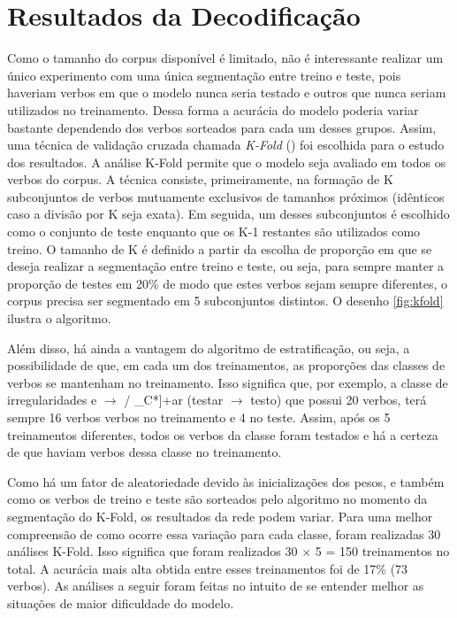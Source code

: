 \section{Resultados da Decodificação}
\label{sec:results}
Como o tamanho do corpus disponível é limitado, não é interessante realizar um único experimento com uma única segmentação entre treino e teste, pois haveriam verbos em que o modelo nunca seria testado e outros que nunca seriam utilizados no treinamento. Dessa forma a acurácia do modelo poderia variar bastante dependendo dos verbos sorteados para cada um desses grupos. Assim, uma técnica de validação cruzada chamada \textit{K-Fold} (\cite{kfold:2018}) foi escolhida para o estudo dos resultados. A análise K-Fold permite que o modelo seja avaliado em todos os verbos do corpus. A técnica consiste, primeiramente, na formação de K subconjuntos de verbos mutuamente exclusivos de tamanhos próximos (idênticos caso a divisão por K seja exata). Em seguida, um desses subconjuntos é escolhido como o conjunto de teste enquanto que os K-1 restantes são utilizados como treino. O tamanho de K é definido a partir da escolha de proporção em que se deseja realizar a segmentação entre treino e teste, ou seja, para sempre manter a proporção de testes em 20\% de modo que estes verbos sejam sempre diferentes, o corpus precisa ser segmentado em 5 subconjuntos distintos. O desenho \ref{fig:kfold} ilustra o algoritmo. 



Além disso, há ainda a vantagem do algoritmo de estratificação, ou seja, a possibilidade de que, em cada um dos treinamentos, as proporções das classes de verbos se mantenham no treinamento. Isso significa que, por exemplo, a classe de irregularidades e $\rightarrow$ \textepsilon / \_C*]+ar (testar $\rightarrow$ testo) que possui 20 verbos, terá sempre 16 verbos verbos no treinamento e 4 no teste. Assim, após os 5 treinamentos diferentes, todos os verbos da classe foram testados e há a certeza de que haviam verbos dessa classe no treinamento. 

Como há um fator de aleatoriedade devido às inicializações dos pesos, e também como os verbos de treino e teste são sorteados pelo algoritmo no momento da segmentação do K-Fold, os resultados da rede podem variar. Para uma melhor compreensão de como ocorre essa variação para cada classe, foram realizadas 30 análises K-Fold. Isso significa que foram realizados 30 $\times$ 5 = 150 treinamentos no total.
A acurácia mais alta obtida entre esses treinamentos foi de 17\% (73 verbos). As análises a seguir foram feitas no intuito de se entender melhor as situações de maior dificuldade do modelo.

